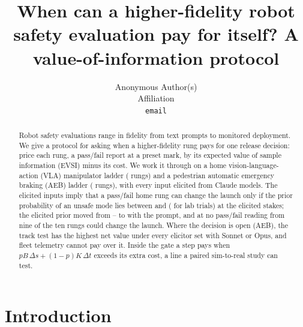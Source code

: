 \documentclass{article}
\title{When can a higher-fidelity robot safety evaluation pay for itself? A value-of-information protocol}
\author{
  Anonymous Author(s)\\
  Affiliation\\
  \texttt{email}
}
\begin{document}
\maketitle

\begin{abstract}
Robot safety evaluations range in fidelity from text prompts to monitored deployment. We give a protocol for asking when a higher-fidelity rung pays for one release decision: price each rung, a pass/fail report at a preset mark, by its expected value of sample information (EVSI) minus its cost. We work it through on a home vision-language-action (VLA) manipulator ladder (\twNHome{} rungs) and a pedestrian automatic emergency braking (AEB) ladder (\twNAeb{} rungs), with every input elicited from Claude models. The elicited inputs imply that a pass/fail home rung can change the launch only if the prior probability of an unsafe mode lies between \twHomeBandLoMin{} and \twHomeBandHiMax{} (\twHomeBandHiLSeven{} for lab trials) at the elicited stakes; the elicited prior moved from \twHomePSingleLo--\twHomePSingleHi{} to \twHomeP{} with the prompt, and at \twHomeP{} no pass/fail reading from nine of the ten rungs could change the launch. Where the decision is open (AEB), the track test has the highest net value under every elicitor set with Sonnet or Opus, and fleet telemetry cannot pay over it. Inside the gate a step pays when $pB\,\Delta s+(1-p)K\,\Delta t$ exceeds its extra cost, a line a paired sim-to-real study can test.
\end{abstract}


\section{Introduction}
\end{document}
